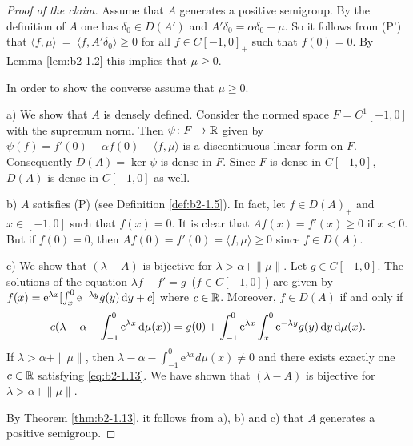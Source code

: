 \begin{proof}[Proof of the claim]
Assume that $A$ generates a positive semigroup.
By the definition of $A$ one has $\delta_{0} \in D(A')$ and $A'\delta_{0} = \alpha\delta_{0} + \mu$.
So it follows from (P') that $\langle f,\mu \rangle~=~\langle f,A'\delta_{0} \rangle \geq 0$ for all $f \in C[-1,0]_{+}$ such that $f(0) = 0$.
By Lemma \ref{lem:b2-1.2}
this implies that $\mu \geq 0$.

In order to show the converse assume that $\mu \geq 0$.

a) We show that $A$ is densely defined.
Consider the normed space $F = C^{1}[-1,0]$ with the supremum norm.
Then $\psi \colon F \to \mathbb{R}$ given by 
$\psi(f) = f'(0) - \alpha f(0) - \langle f,\mu \rangle$ 
is a discontinuous linear form on $F$.
Consequently $D(A) = \ker \psi$ is dense in $F$.
Since $F$ is dense in $C[-1,0]$, $D(A)$ is dense in $C[-1,0]$ as well.

b) $A$ satisfies (P) (see Definition \ref{def:b2-1.5}).
In fact, let $f \in D(A)_{+}$ and $x \in [-1,0]$ such that $f(x) = 0$.
It is clear that $Af(x) = f'(x) \geq 0$ if $x < 0$.
But if $f(0) = 0$, then $Af(0) = f'(0) = \langle f,\mu \rangle \geq 0$ since $f \in D(A)$.

c) We show that $(\lambda-A)$ is bijective for $\lambda > \alpha + \|\mu\|$.
Let $g \in C[-1,0]$.
The solutions of the equation $\lambda f - f' = g$ \,($f \in C[-1,0]$\,) are given by $f(x) = \mathrm{e}^{\lambda x}[\int_{x}^{0} \mathrm{e}^{-\lambda y} g(y) \mathop{}\!\mathrm{d}{y} + c]$ where $c \in \mathbb{R}$.
Moreover, $f \in D(A)$ if and only if
\begin{equation}\label{eq:b2-1.13}
c(\lambda - \alpha - \int_{-1}^{0} \mathrm{e}^{\lambda x} \mathop{}\!\mathrm{d}{\mu(x)}) = g(0) + \int_{-1}^{0} \mathrm{e}^{\lambda x} \int_{x}^{0}\mathrm{e}^{-\lambda y} g(y) \mathop{}\!\mathrm{d}{y}\mathop{}\!\mathrm{d}{\mu(x)}.
\end{equation}
If $\lambda > \alpha + \|\mu\|$, then $\lambda - \alpha - \int_{-1}^{0} \mathrm{e}^{\lambda x} d\mu(x) \neq 0$ and there exists exactly one $c \in \mathbb{R}$ satisfying \eqref{eq:b2-1.13}.
We have shown that $(\lambda- A)$ is bijective for $\lambda > \alpha + \|\mu\|$.

By Theorem \ref{thm:b2-1.13}, it follows from a), b) and c) that $A$ generates a positive semigroup.
\end{proof}

